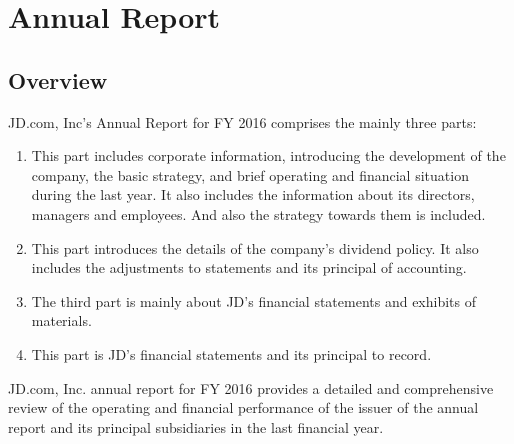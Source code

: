 

\section{Annual Report}
\subsection{Overview}
JD.com, Inc’s Annual Report for FY 2016 comprises the mainly three parts:
\begin{enumerate}
	\item[\uppercase\expandafter{\romannumeral1}] This part includes corporate information, introducing the development of the company, the basic strategy, and brief operating and financial situation during the last year. It also includes the information about its directors, managers and employees. And also the strategy towards them is included.
	\item[\uppercase\expandafter{\romannumeral2}] This part introduces the details of the company’s dividend policy. It also includes the adjustments to statements and its principal of accounting.
	\item[\uppercase\expandafter{\romannumeral3}] The third part is mainly about JD’s financial statements and exhibits of materials.
	\item[\uppercase\expandafter{\romannumeral4}] This part is JD’s financial statements and its principal to record.
\end{enumerate}

JD.com, Inc. annual report for FY 2016 provides a detailed and comprehensive review of the operating and financial performance of the issuer of the annual report and its principal subsidiaries in the last financial year.

